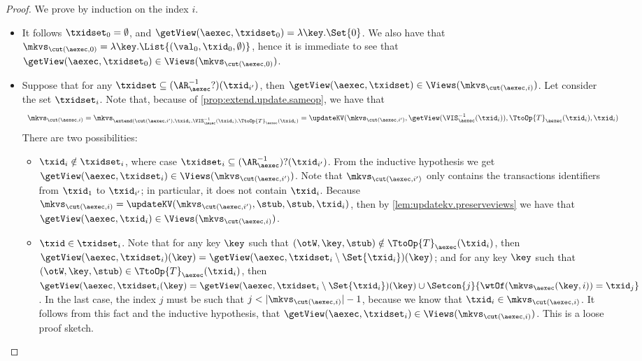 \begin{proof}
We prove by induction on the index $i$. 
\begin{itemize}
\item {} It follows $\txidset_{0} = \emptyset$, and $\getView(\aexec, \txidset_{0}) = \lambda \key. \Set{0}$. 
We also have that $\mkvs_{\cut(\aexec, 0)} = \lambda \key. \List{(\val_0, \txid_{0}, \emptyset)}$, hence 
it is immediate to see that $\getView(\aexec, \txidset_{0}) \in \Views(\mkvs_{\cut(\aexec, 0)})$.

\item {}
Suppose that for any $\txidset \subseteq (\AR_{\aexec}^{-1}?)(\txid_{i'})$, 
then $\getView(\aexec, \txidset) \in \Views(\mkvs_{\cut(\aexec, i)})$. 
Let consider the set $\txidset_{i}$.
Note that, because of \cref{prop:extend.update.sameop}, we have that
\[
\begin{array}{l}
\mkvs_{\cut(\aexec, i)} =
\mkvs_{\extend(\cut(\aexec, i'), \txid_{i}, \VIS^{-1}_{\aexec}(\txid_{i}), \TtoOp{T}_{\aexec}(\txid_{i})} 
= \updateKV(\mkvs_{\cut(\aexec, i')}, \getView(\VIS^{-1}_{\aexec}(\txid_{i})), \TtoOp{T}_{\aexec}(\txid_{i}), \txid_{i})
\end{array}
\]
There are two possibilities:
\begin{itemize}
\item $\txid_{i} \notin \txidset_{i}$, where case $\txidset_{i} \subseteq (\AR_{\aexec}^{-1})?(\txid_{i'})$.
From the inductive hypothesis we get $\getView(\aexec, \txidset_{i}) \in \Views(\mkvs_{\cut(\aexec, i')})$. 
Note that $\mkvs_{\cut(\aexec, i')}$ only contains the transactions identifiers from $\txid_{1}$ to $\txid_{i'}$;
in particular, it does not contain $\txid_{i}$. 
Because $\mkvs_{\cut(\aexec, i)} = \updateKV(\mkvs_{\cut(\aexec, i')}, \stub, \stub, \txid_{i})$, 
then by \cref{lem:updatekv.preserveviews} we have that $\getView(\aexec, \txid_{i}) \in \Views(\mkvs_{\cut(\aexec, i)})$.

\item $\txid \in \txidset_{i}$. Note that for any key $\key$ such that 
$(\otW, \key, \stub) \notin \TtoOp{T}_{\aexec}(\txid_{i})$, then 
$\getView(\aexec, \txidset_{i})(\key) = \getView(\aexec, \txidset_{i} \setminus \Set{\txid_{i}})(\key)$; 
and for any key $\key$ such that $(\otW, \key, \stub) \in \TtoOp{T}_{\aexec}(\txid_{i})$, 
then $\getView(\aexec, \txidset_{i}(\key) = \getView(\aexec, \txidset_{i} \setminus \Set{\txid_{i}})(\key) 
\cup \Setcon{j }{ \wtOf(\mkvs_{\aexec}(\key, i)) = \txid_{j}}$. 
In the last case, the index $j$ must be such that $j < \lvert \mkvs_{\cut(\aexec, i)} \rvert - 1$, 
because we know that $\txid_{i} \in \mkvs_{\cut(\aexec, i)}$. 
It follows from this fact and the inductive hypothesis, 
that $\getView(\aexec, \txidset_{i}) \in \Views(\mkvs_{\cut(\aexec, i)})$.
\ac{This is a loose proof sketch.} 
\end{itemize}
\end{itemize}
\end{proof}

